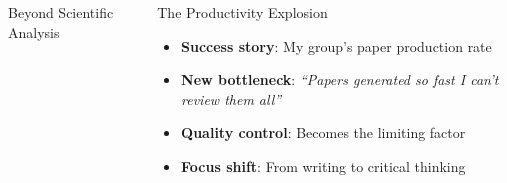\documentclass[aspectratio=169]{beamer}
\begin{document}
\begin{frame}
\begin{columns}
\begin{block}{Beyond Scientific Analysis}
\begin{itemize}
\begin{itemize}
                    \end{itemize}
            \end{itemize}
        \end{block}
        \begin{block}{The Productivity Explosion}
            \begin{itemize}
                \item \textbf{Success story}: My group's paper production rate
                \item \textbf{New bottleneck}: \emph{``Papers generated so fast I can't review them all''}
                \item \textbf{Quality control}: Becomes the limiting factor
                \item \textbf{Focus shift}: From writing to critical thinking
            \end{itemize}
        \end{block}
    \end{columns}
\end{frame}
\end{document}
